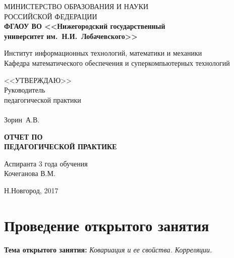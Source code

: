 \documentclass[14pt]{extarticle}
\theoremstyle{theorem}
\theoremstyle{remark}
\begin{document}
\begin{titlepage}

  \begin{center}
  {
    {МИНИСТЕРСТВО ОБРАЗОВАНИЯ И НАУКИ \\РОССИЙСКОЙ ФЕДЕРАЦИИ} }\\
    {
    \textbf{%
    {ФГАОУ ВО 
      <<Нижегородский государственный\\ университет им.~Н.И.~Лобачевского>>}
    }
    }

 \medskip

 
   { Институт информационных технологий, математики и механики }\\
    Кафедра математического обеспечения и суперкомпьютерных технологий

    
 \medskip
  \medskip
   \medskip \medskip
    \medskip
     \medskip
      \medskip
     \hfill
    \begin{minipage}[h]{ 0.33\linewidth}
    <<УТВЕРЖДАЮ>>\\
    Руководитель \\
    педагогической практики\\
\\
    \underline{\hspace{3cm}} Зорин~А.В.
    \end{minipage}
   \medskip \medskip
    \medskip
     \medskip
      \medskip
   \medskip \medskip
    \medskip
     \medskip
      \medskip
      
    \textbf{ОТЧЕТ  ПО}\\ \textbf{ПЕДАГОГИЧЕСКОЙ ПРАКТИКЕ}\\
 \medskip

    
         \medskip
      \medskip
               \medskip
      \medskip
    \hfill
    \begin{minipage}[h]{ 0.5\linewidth}
    Аспиранта 3 года обучения\\
    Кочеганова В.М.
    \end{minipage}
    \vfill {Н.Новгород, 2017}
  \end{center}
\end{titlepage}

\tableofcontents
\newpage

\section{Проведение открытого занятия}

  \medskip
\textbf{Тема открытого занятия:} \textit{Ковариация и ее свойства. Корреляции.}
\end{document}
